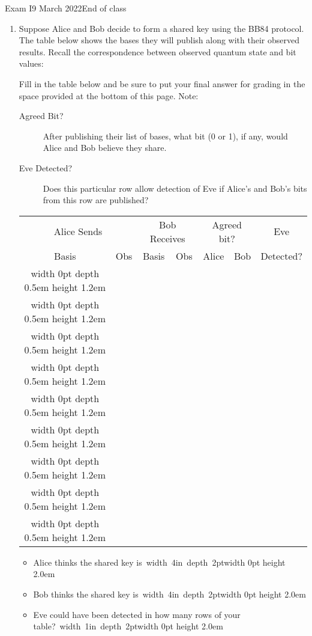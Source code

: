 \documentclass[12pt]{article}
\newcommand{\Blank}[1][1in]{\mbox{\vrule width #1 depth 2pt}\vrule width 0pt height 2.0em}
\begin{document}
\begin{assignment}{Exam I}{9 March 2022}{End of class}
\begin{enumerate}
\clearpage\item{}  Suppose Alice and Bob decide to form a shared key using the BB84 protocol.  The table below shows the bases they will publish along with their observed results.   Recall the correspondence between observed quantum state and bit values:
\begin{BBKey}
\begin{center}
\BBBasis{}
\end{center}
\end{BBKey}
\def\RowU#1#2#3#4{%
\vrule width 0pt depth 0.5em height 1.2em#1 &#2 & #3 & #4 & &  \\ \hline}
\def\Row#1#2#3{%
\RowU{\STD}{#1}{#2}{#3}}
\def\RowX#1#2#3{%
\RowU{\HDM}{#1}{#2}{#3}}

Fill in the table below and be sure to put your final answer for grading in the space provided at the bottom of this page.  Note:
\begin{description}
  \item[Agreed Bit?]  After publishing their list of bases, what bit (0 or 1), if any, would Alice and Bob believe they share.
  \item[Eve Detected?] Does this particular row allow detection of Eve if Alice's and Bob's bits from this row are published?
\end{description}

\begin{BBKey}
\begin{center}\Large
\begin{tabular}{c|c||c|c||c|c||c}
\multicolumn{2}{c||}{Alice Sends} & \multicolumn{2}{c||}{Bob Receives}& \multicolumn{2}{c||}{Agreed bit?}&Eve \\
Basis & Obs & Basis & Obs & Alice & Bob & Detected?\\\hline
\Row{\BBRt}{\STD}{\BBRt}
\Row{\BBUp}{\STD}{\BBUp}
\Row{\BBRt}{\STD}{\BBRt}
\Row{\BBUp}{\HDM}{\BBNe}
\Row{\BBRt}{\HDM}{\BBSe}
\RowX{\BBNe}{\HDM}{\BBSe}
\RowX{\BBSe}{\HDM}{\BBSe}
\RowX{\BBNe}{\HDM}{\BBNe}
\RowX{\BBNe}{\HDM}{\BBNe}

\end{tabular}
\end{center}
\end{BBKey}
\begin{itemize}
    \item Alice thinks the shared key is~\Blank[4in]{}
    \item Bob thinks the shared key is~\Blank[4in]{}
    \item Eve could have been detected in how many rows of your table?~\Blank{}
\end{itemize}


\end{enumerate}
\end{assignment}
\end{document}
